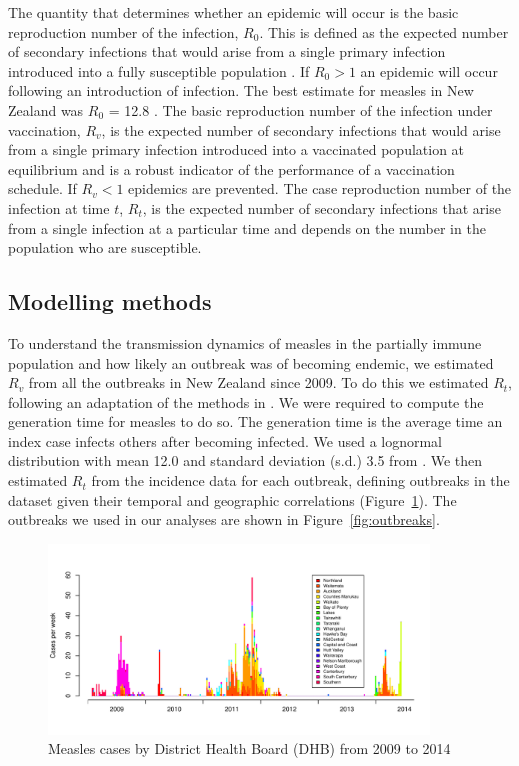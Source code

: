 \documentclass{article}
\begin{document}
The quantity that determines whether an epidemic will occur is the basic reproduction number of the infection, $R_0$. This is defined as the expected number of secondary infections that would arise from a single primary infection introduced into a fully susceptible population \citep{anderson91, diekmann0}. If $R_0 > 1$ an epidemic will occur following an introduction of infection. The best estimate for measles in New Zealand was $R_0$ = 12.8 \citep{roberts4}. The basic reproduction number of the infection under vaccination, $R_v$, is the expected number of secondary infections that would arise from a single primary infection introduced into a vaccinated population at equilibrium and is a robust indicator of the performance of a vaccination schedule. If $R_v < 1$ epidemics are prevented. The case reproduction number of the infection at time $t$, $R_t$, is the expected number of secondary infections that arise from a single infection at a particular time and depends on the number in the population who are susceptible.

\subsection{Modelling methods}

To understand the transmission dynamics of measles in the partially immune population and how likely an outbreak was of becoming endemic, we estimated $R_v$ from all the outbreaks in New Zealand since 2009. To do this we estimated $R_t$, following an adaptation of the methods in \citep{obidia12,wallinga4}. We were required to compute the generation time for measles to do so. The generation time is the average time an index case infects others after becoming infected. We used a lognormal distribution with mean 12.0 and standard deviation (s.d.) 3.5 from \citep{klinkenberg11}. We then estimated $R_t$ from the incidence data for each outbreak, defining outbreaks in the dataset given their temporal and geographic correlations (Figure~\ref{fig:dhbcases}). The outbreaks we used in our analyses are shown in Figure~\ref{fig:outbreaks}.

\begin{figure}
     \centering
     \includegraphics[width=0.9\textwidth]{cases_by_dhb_2009_2014.pdf}
     \caption{Measles cases by District Health Board (DHB) from 2009 to 2014}
     \label{fig:dhbcases}
\end{figure}
\end{document}

